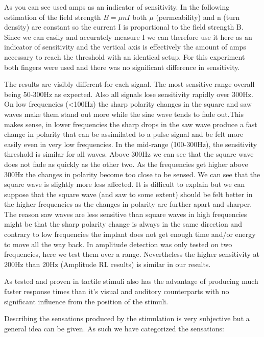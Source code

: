 \documentclass[10pt,journal,compsoc]{IEEEtran}
\begin{document}
	As you can see used amps as an indicator of sensitivity. In the following estimation of the field strength $ B=\mu nI $ both $\mu$ (permeability) and n (turn density) are constant so the current I is proportional to the field strength B. Since we can easily and accurately measure I we can therefore use it here as an indicator of sensitivity and the vertical axis is effectively the amount of amps necessary to reach the threshold with an identical setup. For this experiment both fingers were used and there was no significant difference in sensitivity.
	
	The results are visibly different for each signal. The most sensitive range overall being 50-300Hz as expected. Also all signals lose sensitivity rapidly over 300Hz.
	On low frequencies (<100Hz) the sharp polarity changes in the square and saw waves make them stand out more while the sine wave tends to fade out.This makes sense, in lower frequencies the sharp drops in the saw wave produce a fast change in polarity that can be assimilated to a pulse signal and be felt more easily even in very low frequencies.
	In the mid-range (100-300Hz), the sensitivity threshold is similar for all waves.
	Above 300Hz we can see that the square wave does not fade as quickly as the other two.
	As the frequencies get higher above 300Hz the changes in polarity become too close to be sensed. We can see that the square wave is slightly more less affected. It is difficult to explain but we can suppose that the square wave (and saw to some extent) should be felt better in the higher frequencies as the changes in polarity are further apart and sharper.
	The reason saw waves are less sensitive than square waves in high frequencies might be that the sharp polarity change is always in the same direction and contrary to low frequencies the implant does not get enough time and/or energy to move all the way back.
	In \cite{harrison2018tf} amplitude detection was only tested on two frequencies, here we test them over a range. Nevertheless the higher sensitivity at 200Hz than 20Hz (Amplitude RL results) is similar in our results.
	
	As tested and proven in \cite{chan2012lnecs} tactile stimuli also has the advantage of producing much faster response times than it's visual and auditory counterparts with no significant influence from the position of the stimuli.
	
	Describing the sensations produced by the stimulation is very subjective but a general idea can be given. As such we have categorized the sensations:
	
\end{document}
